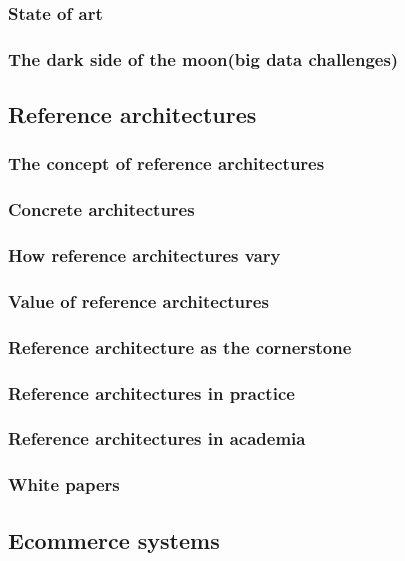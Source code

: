 \documentclass{article}
\begin{document}
\subsubsection{State of art}
\subsubsection{The dark side of the moon(big data challenges)}
\hspace{1cm}

\subsection{Reference architectures}
\subsubsection{The concept of reference architectures}
\subsubsection{Concrete architectures}
\subsubsection{How reference architectures vary}
\subsubsection{Value of reference architectures}
\subsubsection{Reference architecture as the cornerstone}
\subsubsection{Reference architectures in practice}
\subsubsection{Reference architectures in academia}
\subsubsection{White papers}
\hspace{1cm}


\subsection{Ecommerce systems}
\end{document}
